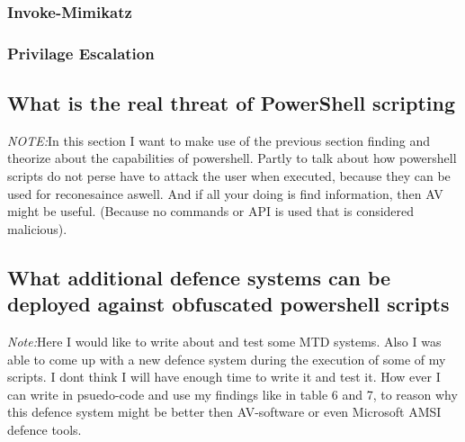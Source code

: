 \documentclass{article}%
\begin{document}
\subsubsection{Invoke-Mimikatz}

\subsubsection{Privilage Escalation}

\subsection{What is the real threat of PowerShell scripting}
\textit{NOTE:}In this section I want to make use of the previous section finding and theorize about the capabilities of powershell. Partly to talk about how powershell scripts do not perse have to attack the user when executed, because they can be used for reconesaince aswell. And if all your doing is find information, then AV might be useful. (Because no commands or API is used that is considered malicious).
\subsection{What additional defence systems can be deployed against obfuscated powershell scripts}
\textit{Note:}Here I would like to write about and test some MTD systems. Also I was able to come up with a new defence system during the execution of some of my scripts. I dont think I will have enough time to write it and test it. How ever I can write in psuedo-code and use my findings like in table 6 and 7, to reason why this defence system might be better then AV-software or even Microsoft AMSI defence tools.
\newpage
\end{document}
